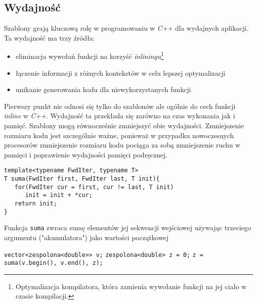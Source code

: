 \documentclass[11pt, a4paper]{article}
\begin{document}
\lstset{language=C++}

\subsection{Wydajność}

Szablony grają kluczową rolę w programowaniu w \emph{C++} dla wydajnych aplikacji. Ta wydajność ma trzy źródła:

\begin{itemize}

\item eliminacja wywołań funkcji na korzyść \emph{inliningu}\footnote{Optymalizacja kompilatora, która zamienia wywołanie funkcji na jej ciało w czasie kompilacji.}
\item łączenie informacji z różnych kontekstów w celu lepszej optymalizacji
\item unikanie generowania kodu dla niewykorzystanych funkcji

\end{itemize}

Pierwszy punkt nie odnosi się tylko do szablonów ale ogólnie do cech funkcji \emph{inline} w \emph{C++}. 
Wydajność ta przekłada się zarówno na czas wykonania jak i pamięć. Szablony mogą równocześnie zmniejszyć obie wydajności. Zmniejszenie rozmiaru kodu jest szczególnie ważne, ponieważ w przypadku nowoczesnych procesorów zmniejszenie rozmiaru kodu pociąga za sobą zmniejszenie ruchu w pamięci i poprawienie wydajności pamięci podręcznej.


\begin{lstlisting}[frame=single]
template<typename FwdIter, typename T>
T suma(FwdIter first, FwdIter last, T init){
   for(FwdIter cur = first, cur != last, T init)
      init = init + *cur;
   return init;
}

\end{lstlisting}

Funkcja \verb#suma# zwraca sumę elementów jej sekwencji wejściowej używając trzeciego argumentu ("akumulatora") jako wartości początkowej\newline

\noindent \verb#vector<zespolona<double>> v;#  \newline
\verb#zespolona<double> z = 0;# \newline
\verb#z = suma(v.begin(), v.end(), z);# \newline
\end{document}
